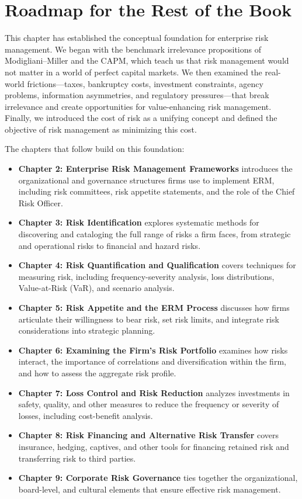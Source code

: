 \documentclass[11pt,openany]{book}
\begin{document}
\section{Roadmap for the Rest of the Book}\label{roadmap-for-the-rest-of-the-book}

This chapter has established the conceptual foundation for enterprise risk management. We began with the benchmark irrelevance propositions of Modigliani--Miller and the CAPM, which teach us that risk management would not matter in a world of perfect capital markets. We then examined the real-world frictions---taxes, bankruptcy costs, investment constraints, agency problems, information asymmetries, and regulatory pressures---that break irrelevance and create opportunities for value-enhancing risk management. Finally, we introduced the cost of risk as a unifying concept and defined the objective of risk management as minimizing this cost.

The chapters that follow build on this foundation:

\begin{itemize}
\item
  \textbf{Chapter 2: Enterprise Risk Management Frameworks} introduces the organizational and governance structures firms use to implement ERM, including risk committees, risk appetite statements, and the role of the Chief Risk Officer.
\item
  \textbf{Chapter 3: Risk Identification} explores systematic methods for discovering and cataloging the full range of risks a firm faces, from strategic and operational risks to financial and hazard risks.
\item
  \textbf{Chapter 4: Risk Quantification and Qualification} covers techniques for measuring risk, including frequency-severity analysis, loss distributions, Value-at-Risk (VaR), and scenario analysis.
\item
  \textbf{Chapter 5: Risk Appetite and the ERM Process} discusses how firms articulate their willingness to bear risk, set risk limits, and integrate risk considerations into strategic planning.
\item
  \textbf{Chapter 6: Examining the Firm's Risk Portfolio} examines how risks interact, the importance of correlations and diversification within the firm, and how to assess the aggregate risk profile.
\item
  \textbf{Chapter 7: Loss Control and Risk Reduction} analyzes investments in safety, quality, and other measures to reduce the frequency or severity of losses, including cost-benefit analysis.
\item
  \textbf{Chapter 8: Risk Financing and Alternative Risk Transfer} covers insurance, hedging, captives, and other tools for financing retained risk and transferring risk to third parties.
\item
  \textbf{Chapter 9: Corporate Risk Governance} ties together the organizational, board-level, and cultural elements that ensure effective risk management.
\end{itemize}
\end{document}
